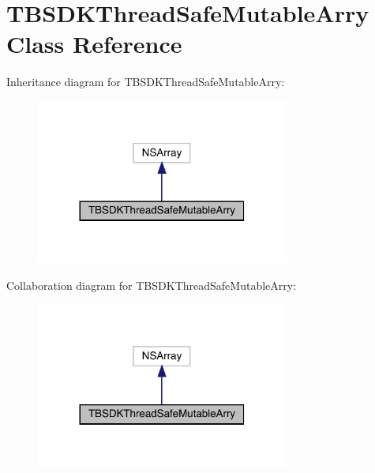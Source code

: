 \hypertarget{interface_t_b_s_d_k_thread_safe_mutable_arry}{}\section{T\+B\+S\+D\+K\+Thread\+Safe\+Mutable\+Arry Class Reference}
\label{interface_t_b_s_d_k_thread_safe_mutable_arry}


Inheritance diagram for T\+B\+S\+D\+K\+Thread\+Safe\+Mutable\+Arry\+:\nopagebreak
\begin{figure}[H]
\begin{center}
\leavevmode
\includegraphics[width=236pt]{interface_t_b_s_d_k_thread_safe_mutable_arry__inherit__graph}
\end{center}
\end{figure}


Collaboration diagram for T\+B\+S\+D\+K\+Thread\+Safe\+Mutable\+Arry\+:\nopagebreak
\begin{figure}[H]
\begin{center}
\leavevmode
\includegraphics[width=236pt]{interface_t_b_s_d_k_thread_safe_mutable_arry__coll__graph}
\end{center}
\end{figure}
